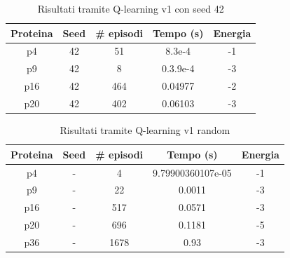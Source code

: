 \documentclass[conference]{IEEEtran}
\begin{document}
\begin{table}[H]
\begin{center}
\begin{tabular}{|c|c|c|c|c|}
\hline
\textbf{Proteina} & \textbf{Seed} & \textbf{\# episodi} & \textbf{Tempo (s)} & \textbf{Energia} \\ \hline
p4 & 42 & 51 & 8.3e-4 & -1 \\ \hline
p9 & 42 & 8 & 0.3.9e-4 & -3 \\ \hline
p16 & 42 & 464 & 0.04977 & -2 \\ \hline
p20 & 42 & 402 & 0.06103 & -3 \\ \hline
\end{tabular}
\end{center}
\caption{Risultati tramite Q-learning v1 con seed 42}
\end{table}

\begin{table}[H]
\begin{center}
\begin{tabular}{|c|c|c|c|c|}
\hline
\textbf{Proteina} & \textbf{Seed} & \textbf{\# episodi} & \textbf{Tempo (s)} & \textbf{Energia} \\ \hline
p4 & - & 4 & 9.79900360107e-05 & -1 \\ \hline
p9 & - & 22 & 0.0011 & -3 \\ \hline
p16 & - & 517 & 0.0571 & -3 \\ \hline
p20 & - & 696 & 0.1181 & -5 \\ \hline
p36 & - & 1678 & 0.93 & -3 \\ \hline
\end{tabular}
\end{center}
\caption{Risultati tramite Q-learning v1 random}
\end{table}

\appendix
\label{appendix:sviluppo}
\end{document}
